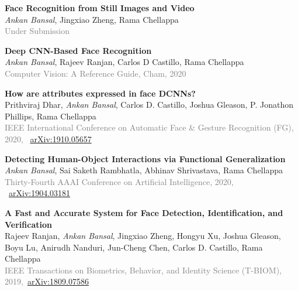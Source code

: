\documentclass[11pt, a4paper]{article}
\begin{document}
\vspace{4pt}

\textbf{Face Recognition from Still Images and Video}\\
\textit{Ankan Bansal}, Jingxiao Zheng, Rama Chellappa\\
\textcolor{gray}{Under Submission}

\vspace{4pt}

\textbf{Deep CNN-Based Face Recognition}\\
\textit{Ankan Bansal}, Rajeev Ranjan, Carlos D Castillo, Rama Chellappa\\
\textcolor{gray}{Computer Vision: A Reference Guide, Cham, 2020}

%
\vspace{4pt}

\textbf{How are attributes expressed in face DCNNs?}\\
Prithviraj Dhar, \textit{Ankan Bansal}, Carlos D. Castillo, Joshua Gleason, P. Jonathon Phillips, Rama Chellappa\\
\textcolor{gray}{IEEE International Conference on Automatic Face \& Gesture Recognition (FG), 2020,} ~\href{https://arxiv.org/abs/1910.05657}{arXiv:1910.05657}

\vspace{4pt}

\textbf{Detecting Human-Object Interactions via Functional Generalization}\\
\textit{Ankan Bansal}, Sai Saketh Rambhatla, Abhinav Shrivastava, Rama Chellappa\\
\textcolor{gray}{Thirty-Fourth AAAI Conference on Artificial Intelligence, 2020,} ~\href{https://arxiv.org/abs/1904.03181}{arXiv:1904.03181}

\vspace{4pt}

\textbf{A Fast and Accurate System for Face Detection, Identification, and Verification} \\
Rajeev Ranjan, \textit{Ankan Bansal}, Jingxiao Zheng, Hongyu Xu, Joshua Gleason, Boyu Lu, Anirudh
Nanduri, Jun-Cheng Chen, Carlos D. Castillo, Rama Chellappa\\
\textcolor{gray}{IEEE Transactions on Biometrics, Behavior, and Identity Science (T-BIOM), 2019,}~\href{https://arxiv.org/abs/1809.07586}{arXiv:1809.07586}
\end{document}
